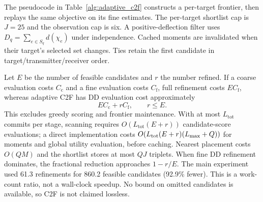 The pseudocode in Table~\ref{alg:adaptive_c2f} constructs a per-target frontier,
then replays the same objective on its fine estimates. The per-target
shortlist cap is $J=25$ and the observation cap is six. A positive-deflection
filter uses $D_q=\sum_{e\in S_q}d(\chi_e)$ under independence.
Cached moments are invalidated when their target's selected set changes.
Ties retain the first candidate in target/transmitter/receiver order.

Let $E$ be the number of feasible candidates and $r$ the number refined. If a
coarse evaluation costs $C_{\mathrm c}$ and a fine evaluation costs
$C_{\mathrm f}$, full refinement costs $EC_{\mathrm f}$, whereas adaptive C2F
has DD evaluation cost approximately
\begin{equation}
	EC_{\mathrm c}+rC_{\mathrm f},\qquad r\le E.
	\label{eq:c2f_complexity}
\end{equation}
This excludes greedy scoring and frontier maintenance. With at most
$L_{\mathrm{tot}}$ commits per stage, scanning requires
$O(L_{\mathrm{tot}}(E+r))$ candidate-score evaluations; a direct implementation costs
$O(L_{\rm tot}(E+r)(L_{\max}+Q))$ for moments and global utility evaluation,
before caching. Nearest placement costs $O(QM)$ and the shortlist stores
at most $QJ$ triplets. When fine DD refinement dominates, the fractional reduction approaches $1-r/E$.
The main experiment used 61.3 refinements for 860.2 feasible candidates
(92.9\% fewer). This is a work-count ratio, not a wall-clock speedup.
No bound on omitted candidates is available, so C2F is not claimed lossless.
